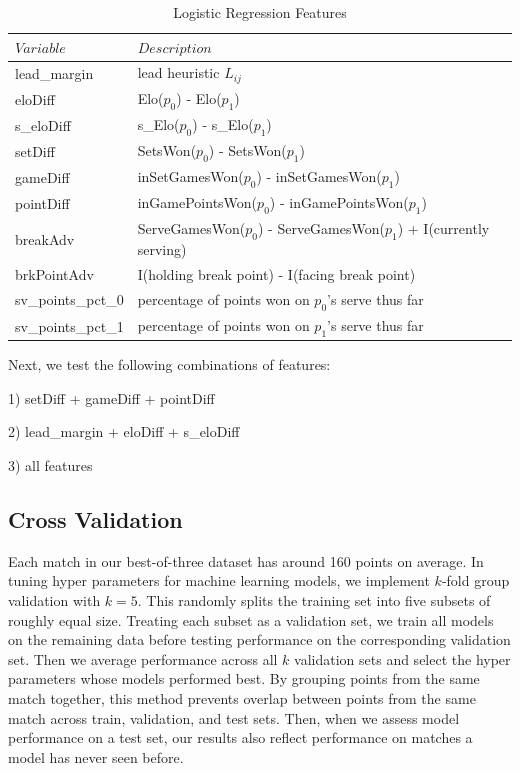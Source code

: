\documentclass[chapterprefix=false]{report}
\begin{document}
\begin{table}[H]
\centering
\caption{Logistic Regression Features}
\label{my-label}
\begin{tabular}{ll}
 \hline
 $Variable$ & $Description$ \\
 \hline
 lead\_margin & lead heuristic $L_{ij}$ \\
 \hline
 eloDiff &  Elo($p_0$) - Elo($p_1$) \\
 \hline
  s\_eloDiff &  s\_Elo($p_0$) - s\_Elo($p_1$) \\
 \hline
 setDiff &  SetsWon($p_0$) - SetsWon($p_1$)\\
 \hline
 gameDiff &  inSetGamesWon($p_0$) - inSetGamesWon($p_1$)\\
 \hline
 pointDiff &  inGamePointsWon($p_0$) - inGamePointsWon($p_1$)\\
 \hline
  breakAdv &  ServeGamesWon($p_0$) - ServeGamesWon($p_1$) + I(currently serving)\\
 \hline
 brkPointAdv & I(holding break point) - I(facing break point)\\
 \hline
 sv\_points\_pct\_0 & percentage of points won on $p_0$'s serve thus far\\
 \hline
 sv\_points\_pct\_1 & percentage of points won on $p_1$'s serve thus far\\
 \hline
\end{tabular}
\end{table}

Next, we test the following combinations of features:

1) setDiff + gameDiff + pointDiff

2) lead\_margin + eloDiff + s\_eloDiff

3) all features

\subsection{Cross Validation}

Each match in our best-of-three dataset has around 160 points on average. In tuning hyper parameters for machine learning models, we implement $k$-fold group validation with $k=5$. This randomly splits the training set into five subsets of roughly equal size. Treating each subset as a validation set, we train all models on the remaining data before testing performance on the corresponding validation set. Then we average performance across all $k$ validation sets and select the hyper parameters whose models performed best. By grouping points from the same match together, this method prevents overlap between points from the same match across train, validation, and test sets. Then, when we assess model performance on a test set, our results also reflect performance on matches a model has never seen before. 
\end{document}

